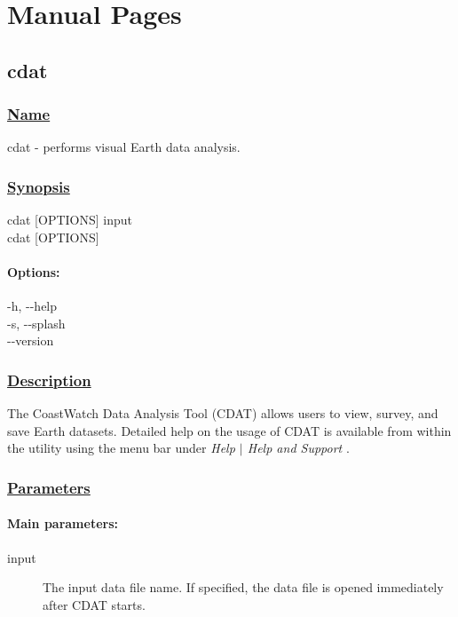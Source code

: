 \chapter{Manual Pages}
\label{manual}
\section{cdat} \hypertarget{cdat}{}
\subsection*{\underline{Name}}


   cdat - performs visual Earth data analysis.  
\subsection*{\underline{Synopsis}}


  cdat [OPTIONS] input \\ 
 cdat [OPTIONS] 
\subsubsection*{Options:}


  -h, -{-}help \\ 
 -s, -{-}splash \\ 
 -{-}version \\ 

\subsection*{\underline{Description}}


 The CoastWatch Data Analysis Tool (CDAT) allows users to view, survey, and save Earth datasets. Detailed help on the usage of CDAT is available from within the utility using the menu bar under \emph{Help $|$ Help and Support}
.
\subsection*{\underline{Parameters}}
\subsubsection*{Main parameters:}
\begin{description}
\item[input]The input data file name. If specified, the data file is opened immediately after CDAT starts.

\end{description}
